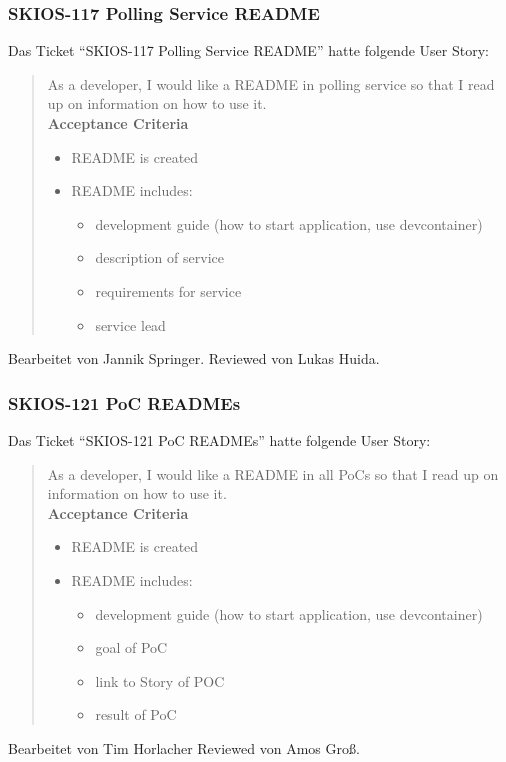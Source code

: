 \subsubsection{SKIOS-117 Polling Service README}
Das Ticket \enquote{SKIOS-117 Polling Service README} hatte folgende User Story:
\begin{quotation}
    As a developer, I would like a README in polling service so that I read up on information on how to use it. \\
\textbf{Acceptance Criteria}
\begin{itemize}
    \item README is created
    \item README includes:
    \begin{itemize}
        \item development guide (how to start application, use devcontainer)
        \item description of service
        \item requirements for service
        \item service lead
    \end{itemize}
\end{itemize}
\end{quotation}
Bearbeitet von Jannik Springer.
Reviewed von Lukas Huida.

\subsubsection{SKIOS-121 PoC READMEs}
Das Ticket \enquote{SKIOS-121 PoC READMEs} hatte folgende User Story:
\begin{quotation}
    As a developer, I would like a README in all PoCs so that I read up on information on how to use it. \\
\textbf{Acceptance Criteria}
\begin{itemize}
    \item README is created
    \item README includes:
    \begin{itemize}
        \item development guide (how to start application, use devcontainer)
        \item goal of PoC
        \item link to Story of POC
        \item result of PoC
    \end{itemize}
\end{itemize}
\end{quotation}
Bearbeitet von Tim Horlacher
Reviewed von Amos Groß.

